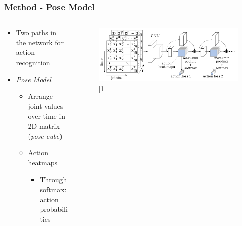 \documentclass[9pt]{beamer}
\providecommand{\sourcefix}[1]{\\ \footnotesize \tugreen{Source:} [#1]}
\newenvironment{myframe}[1][]{%
\begin{frame}%
\frametitle{#1}
\setcounter{footnote}{0}


}{%
\end{frame}%
}
\begin{document}
\begin{myframe}[Method - Pose Model]
	\begin{columns}[T]
        \begin{column}{.45\textwidth}
            \begin{itemize}
                \item Two paths in the network for action recognition
                \item \textit{Pose Model}
                \begin{itemize}
                    \item Arrange joint values over time in 2D matrix (\textit{pose cube})
                    \item Action heatmaps
                    \begin{itemize}
                        \item Through softmax: action probabilities
                    \end{itemize}
                \end{itemize}
            \end{itemize}
        \end{column}
        \begin{column}{.45\textwidth}
            \begin{figure}
                \includegraphics[width=.99\textwidth]{jointsovertime.png}
                \sourcefix{1}
            \end{figure}
        \end{column}
	\end{columns}
\end{myframe}

\end{document}
